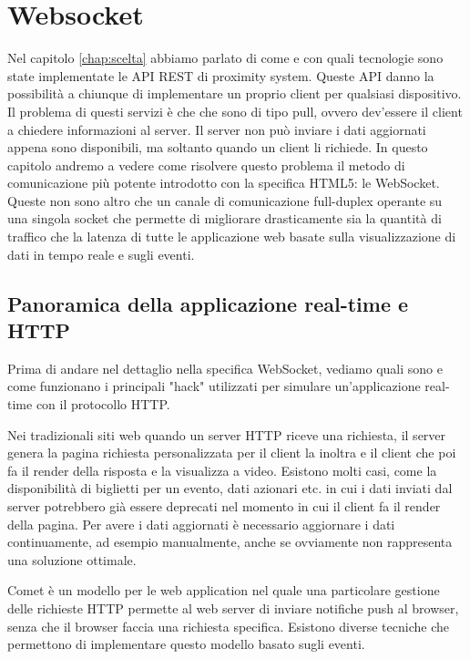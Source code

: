 \chapter{Websocket}
\label{chap:websocket}
\nocite{html5}
Nel capitolo \ref{chap:scelta} abbiamo parlato di come e con quali tecnologie sono state implementate le API REST di proximity system.  
Queste API danno la possibilità a chiunque di implementare un proprio client per qualsiasi dispositivo. 
Il problema di questi servizi è che che sono di tipo pull, ovvero dev'essere il client a chiedere informazioni al server. 
Il server non può inviare i dati aggiornati appena sono disponibili,
ma soltanto quando un client li richiede.
In questo capitolo andremo a vedere come risolvere questo problema il metodo di comunicazione più potente introdotto con la specifica HTML5: le WebSocket.
Queste non sono altro che un canale di comunicazione full-duplex operante su una singola socket che permette di migliorare drasticamente sia la quantità di traffico che la latenza di tutte le applicazione web basate sulla visualizzazione di dati in tempo reale e sugli eventi.
  
\section{Panoramica della applicazione real-time e HTTP}
\label{sec:real-time}
Prima di andare nel dettaglio nella specifica WebSocket, vediamo quali sono e come funzionano i principali "hack" utilizzati per simulare un'applicazione real-time con il protocollo HTTP.

Nei tradizionali siti web quando un server HTTP riceve una richiesta, il server genera la pagina richiesta personalizzata per il client la inoltra e il client che poi fa il render della risposta e la visualizza a video.
Esistono molti casi, come la disponibilità di biglietti per un evento, dati azionari etc. in cui i dati inviati dal server potrebbero già essere deprecati nel momento in cui il client fa il render della pagina. 
Per avere i dati aggiornati è necessario aggiornare i dati continuamente, ad esempio manualmente, anche se ovviamente non rappresenta una soluzione ottimale.

Comet è un modello per le web application nel quale una particolare gestione 
delle richieste HTTP permette al web server di inviare notifiche push al browser, senza che il browser faccia una richiesta specifica.
Esistono diverse tecniche che permettono di implementare questo modello basato sugli eventi. 

